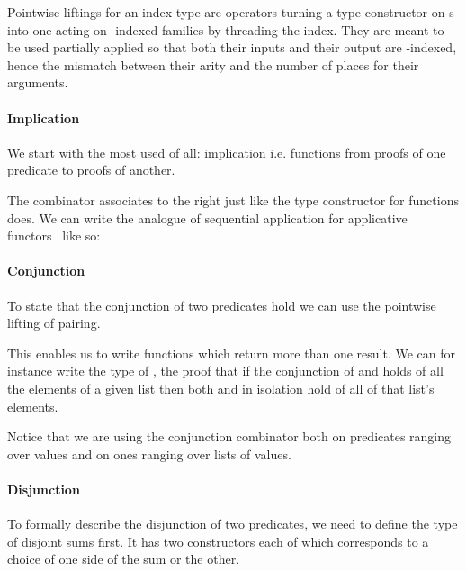 Pointwise liftings for an index type  are operators turning a type
constructor on s into one acting on -indexed families by
threading the index. They are meant to be used partially applied so that
both their inputs and their output are -indexed, hence the mismatch
between their arity and the number of places for their arguments.

\paragraph{Implication} We start with the most used of all: implication
i.e. functions from proofs of one predicate to proofs of another.

The combinator  associates to the right just like the type
constructor for functions does. We can write the analogue of sequential
application for applicative functors~\cite{DBLP:journals/jfp/McbrideP08}
like so:

\paragraph{Conjunction} To state that the conjunction of two predicates hold
we can use the pointwise lifting of pairing.


This enables us to write functions which return more than one result. We can
for instance write the type of , the proof that if the conjunction
of  and  holds of all the elements of a given list then both
 and  in isolation hold of all of that list's elements.


Notice that we are using the conjunction combinator both on predicates ranging
over values and on ones ranging over lists of values.

\paragraph{Disjunction} To formally describe the disjunction of two predicates,
we need to define  the type of disjoint sums first. It has two
constructors each of which corresponds to a choice of one side of the sum or
the other.


